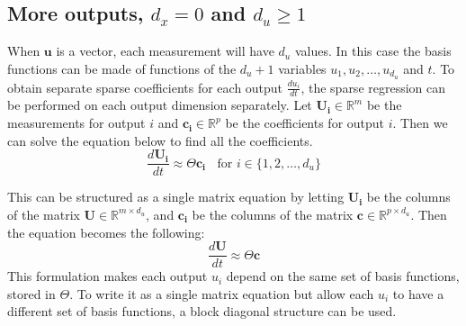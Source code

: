 \documentclass{article}
\let\vec\mathbf
\def\real{\mathbb{R}}
\begin{document}
\subsection{More outputs, $d_x = 0$ and $d_u \ge 1$} \label{section:more-outputs}

When $\vec{u}$ is a vector, each measurement will have $d_u$ values. In this
case the basis functions can be made of functions of the $d_u+1$ variables
$u_1,u_2,\hdots,u_{d_u}$ and $t$. To obtain separate sparse coefficients for
each output $\frac{du_i}{dt}$, the sparse regression can be performed on each
output dimension separately. Let $\vec{U_i} \in \real^{m}$ be the measurements
for output $i$ and $\vec{c_i} \in \real^p$ be the coefficients for output $i$.
Then we can solve the equation below to find all the coefficients.
\begin{equation}\label{eq:same-theta-eqs}
\frac{d\vec{U_i}}{dt} \approx \Theta \vec{c_i} \,\,\ \text{ for $i \in \{1,2,\hdots,d_u\} $}
\end{equation}

This can be structured as a single matrix equation by letting $\vec{U_i}$ be the
columns of the matrix $\vec{U} \in \real^{m \times d_u}$, and $\vec{c_i}$ be the
columns of the matrix $\vec{c} \in \real^{p \times d_u}$. Then the equation
becomes the following:
\begin{equation*}
\frac{d\vec{U}}{dt} \approx \Theta \vec{c}
\end{equation*}
This formulation makes each output $u_i$ depend on the same set of basis
functions, stored in $\Theta$. To write it as a single matrix equation but allow
each $u_i$ to have a different set of basis functions, a block diagonal
structure can be used.
\end{document}
